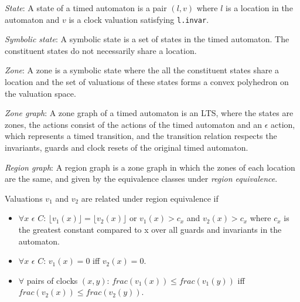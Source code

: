\documentclass[a4paper]{llncs}
\begin{document}
\begin{definition}
  \emph{State}: A state of a timed automaton is a pair $(l, v)$
  where $l$ is a location in the automaton and $v$ is a clock
  valuation satisfying \texttt{l.invar}.
\end{definition}

\begin{definition}
  \emph{Symbolic state}: A symbolic state is a set of states in
  the timed automaton. The constituent states do not necessarily share
  a location.
\end{definition}

\begin{definition}
  \emph{Zone}: A zone is a symbolic state where the all the
  constituent states share a location and the set of valuations of
  these states forms a convex polyhedron on the valuation space.
\end{definition}

\begin{definition}
  \emph{Zone graph}: A zone graph of a timed automaton is an LTS, where
  the states are zones, the actions consist of the actions of the
  timed automaton and an $\epsilon$ action, which represents a timed
  transition, and the transition relation respects the invariants,
  guards and clock resets of the original timed automaton.
\end{definition}

\begin{definition}
  \emph{Region graph}: A region graph is a zone graph in which the
  zones of each location are the same, and given by the equivalence
  classes under \emph{region equivalence}.

  Valuations $v_1$ and $v_2$ are related under region equivalence if 
  \begin{itemize}
    \item $\forall x$ $\epsilon$ $C$: $\lfloor v_1(x) \rfloor = \lfloor
      v_2(x) \rfloor$ or $v_1(x) > c_x$ and $v_2(x) > c_x$ where $c_x$
      is the greatest constant compared to x over all guards and
      invariants in the automaton.
    \item $\forall x$ $\epsilon$ $C$: $v_1(x) = 0$ iff $v_2(x) = 0$.
    \item $\forall$ pairs of clocks $(x, y)$: $frac(v_1(x)) \leq
      frac(v_1(y))$ iff $frac(v_2(x)) \leq frac(v_2(y))$.
  \end{itemize}
\end{definition}
\end{document}
